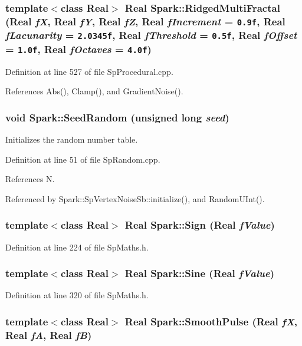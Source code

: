\subsubsection{\setlength{\rightskip}{0pt plus 5cm}template$<$class Real$>$ Real Spark::Ridged\-Multi\-Fractal (Real {\em f\-X}, Real {\em f\-Y}, Real {\em f\-Z}, Real {\em f\-Increment} = {\tt 0.9f}, Real {\em f\-Lacunarity} = {\tt 2.0345f}, Real {\em f\-Threshold} = {\tt 0.5f}, Real {\em f\-Offset} = {\tt 1.0f}, Real {\em f\-Octaves} = {\tt 4.0f})}\label{namespaceSpark_a81}


Definition at line 527 of file Sp\-Procedural.cpp.

References Abs(), Clamp(), and Gradient\-Noise().
\subsubsection{\setlength{\rightskip}{0pt plus 5cm}void Spark::Seed\-Random (unsigned long {\em seed})}\label{namespaceSpark_a112}


Initializes the random number table. 

Definition at line 51 of file Sp\-Random.cpp.

References N.

Referenced by Spark::Sp\-Vertex\-Noise\-Sb::initialize(), and Random\-UInt().
\subsubsection{\setlength{\rightskip}{0pt plus 5cm}template$<$class Real$>$ Real Spark::Sign (Real {\em f\-Value})}\label{namespaceSpark_a52}


Definition at line 224 of file Sp\-Maths.h.
\subsubsection{\setlength{\rightskip}{0pt plus 5cm}template$<$class Real$>$ Real Spark::Sine (Real {\em f\-Value})}\label{namespaceSpark_a66}


Definition at line 320 of file Sp\-Maths.h.
\subsubsection{\setlength{\rightskip}{0pt plus 5cm}template$<$class Real$>$ Real Spark::Smooth\-Pulse (Real {\em f\-X}, Real {\em f\-A}, Real {\em f\-B})}\label{namespaceSpark_a105}


